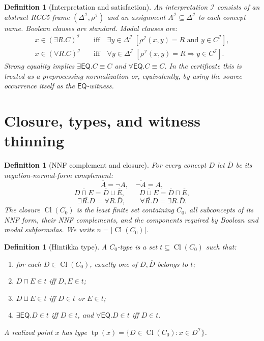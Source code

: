 \documentclass[11pt]{article}
\newtheorem{definition}[theorem]{Definition}
\newcommand{\Cl}{\operatorname{Cl}}
\newcommand{\EQ}{\mathsf{EQ}}
\newcommand{\I}{\mathcal I}
\newcommand{\typ}{\operatorname{tp}}
\begin{document}
\begin{definition}[Interpretation and satisfaction]
An interpretation \(\I\) consists of an abstract RCC5 frame \((\Delta^\I,\rho^\I)\) and an assignment \(A^\I\subseteq\Delta^\I\) to each concept name.  Boolean clauses are standard.  Modal clauses are:
\[
\begin{aligned}
  x\in(\exists R.C)^\I &\quad\text{iff}\quad \exists y\in\Delta^\I\;[\rho^\I(x,y)=R\text{ and }y\in C^\I],\\
  x\in(\forall R.C)^\I &\quad\text{iff}\quad \forall y\in\Delta^\I\;[\rho^\I(x,y)=R\Rightarrow y\in C^\I].
\end{aligned}
\]
Strong equality implies \(\exists\EQ.C\equiv C\) and \(\forall\EQ.C\equiv C\).  In the certificate this is treated as a preprocessing normalization or, equivalently, by using the source occurrence itself as the \(\EQ\)-witness.
\end{definition}

\section{Closure, types, and witness thinning}

\begin{definition}[NNF complement and closure]
For every concept \(D\) let \(\overline D\) be its negation-normal-form complement:
\[
\overline{A}=\neg A,\quad \overline{\neg A}=A,
\]
\[
\overline{D\sqcap E}=\overline D\sqcup\overline E,
\qquad
\overline{D\sqcup E}=\overline D\sqcap\overline E,
\]
\[
\overline{\exists R.D}=\forall R.\overline D,
\qquad
\overline{\forall R.D}=\exists R.\overline D.
\]
The closure \(\Cl(C_0)\) is the least finite set containing \(C_0\), all subconcepts of its NNF form, their NNF complements, and the components required by Boolean and modal subformulas.  We write \(n=|\Cl(C_0)|\).
\end{definition}

\begin{definition}[Hintikka type]
A \(C_0\)-type is a set \(t\subseteq\Cl(C_0)\) such that:
\begin{enumerate}[label=(T\arabic*)]
\item for each \(D\in\Cl(C_0)\), exactly one of \(D,\overline D\) belongs to \(t\);
\item \(D\sqcap E\in t\) iff \(D,E\in t\);
\item \(D\sqcup E\in t\) iff \(D\in t\) or \(E\in t\);
\item \(\exists\EQ.D\in t\) iff \(D\in t\), and \(\forall\EQ.D\in t\) iff \(D\in t\).
\end{enumerate}
A realized point \(x\) has type \(\typ(x)=\{D\in\Cl(C_0):x\in D^\I\}\).
\end{definition}
\end{document}
